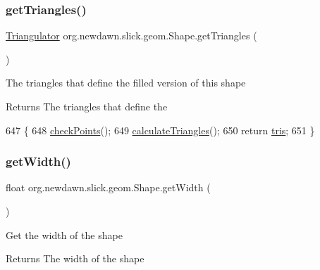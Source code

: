 \subsubsection{\texorpdfstring{get\+Triangles()}{getTriangles()}}
{\footnotesize\ttfamily \mbox{\hyperlink{interfaceorg_1_1newdawn_1_1slick_1_1geom_1_1_triangulator}{Triangulator}} org.\+newdawn.\+slick.\+geom.\+Shape.\+get\+Triangles (\begin{DoxyParamCaption}{ }\end{DoxyParamCaption})\hspace{0.3cm}{\ttfamily [inline]}}

The triangles that define the filled version of this shape

\begin{DoxyReturn}{Returns}
The triangles that define the 
\end{DoxyReturn}

\begin{DoxyCode}
647                                        \{
648         \mbox{\hyperlink{classorg_1_1newdawn_1_1slick_1_1geom_1_1_shape_a84293802d05e8666a441720bfc12745d}{checkPoints}}();
649         \mbox{\hyperlink{classorg_1_1newdawn_1_1slick_1_1geom_1_1_shape_adb889f4f2a9d2838790ead72bf3df1f1}{calculateTriangles}}();
650         \textcolor{keywordflow}{return} \mbox{\hyperlink{classorg_1_1newdawn_1_1slick_1_1geom_1_1_shape_abd907aa2c7a270db435ed15ce6d090da}{tris}};
651     \}
\end{DoxyCode}
\mbox{\label{classorg_1_1newdawn_1_1slick_1_1geom_1_1_shape_aa5a7939b4bbd8e225820b5d5f1efe9e1}} 
\subsubsection{\texorpdfstring{get\+Width()}{getWidth()}}
{\footnotesize\ttfamily float org.\+newdawn.\+slick.\+geom.\+Shape.\+get\+Width (\begin{DoxyParamCaption}{ }\end{DoxyParamCaption})\hspace{0.3cm}{\ttfamily [inline]}}

Get the width of the shape

\begin{DoxyReturn}{Returns}
The width of the shape 
\end{DoxyReturn}

